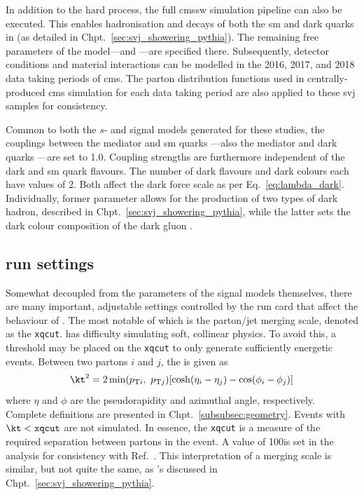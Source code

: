 In addition to the hard process, the full \acrshort{cmssw} simulation pipeline can also be executed. This enables hadronisation and decays of both the \acrshort{sm} and dark quarks in \PYTHIA (as detailed in Chpt.~\ref{sec:svj_showering_pythia}). The remaining free parameters of the model---\aDark and \rinv---are specified there. Subsequently, detector conditions and material interactions can be modelled in the 2016, 2017, and 2018 data taking periods of \acrshort{cms}. The parton distribution functions used in centrally-produced \acrshort{cms} simulation for each data taking period are also applied to these \gls{svj} samples for consistency.

Common to both the $s$- and \tchannel signal models generated for these studies, the couplings between the mediator and \acrshort{sm} quarks \gq---also the mediator and dark quarks \gqdark---are set to 1.0. Coupling strengths are furthermore independent of the dark and \acrshort{sm} quark flavours. The number of dark flavours and dark colours each have values of 2. Both affect the dark force scale as per Eq.~\ref{eq:lambda_dark}. Individually, former parameter allows for the production of two types of dark hadron, described in Chpt.~\ref{sec:svj_showering_pythia}, while the latter sets the dark colour composition of the dark gluon \Pgdark. 




\subsection{\texorpdfstring{\MADGRAPH}{MadGraph} run settings}
\label{subsec:svj_mg_run_settings}

Somewhat decoupled from the parameters of the signal models themselves, there are many important, adjustable settings controlled by the run card that affect the behaviour of \MADGRAPH. The most notable of which is the parton/\gls{jet} merging scale, denoted as the \texttt{xqcut}. \MADGRAPH has difficulty simulating soft, collinear physics. To avoid this, a threshold may be placed on the \texttt{xqcut} to only generate sufficiently energetic events. Between two partons $i$ and $j$, the \kt is given as
\begin{equation}
    \kt^2 = 2 \min(p_{\mathrm{T}i}, \ p_{\mathrm{T}j}) [\cosh(\eta_i - \eta_j) - \cos(\phi_i - \phi_j)]
    \label{eq:svj_mg_kt}
\end{equation}
where $\eta$ and $\phi$ are the pseudorapidity and azimuthal angle, respectively. Complete definitions are presented in Chpt.~\ref{subsubsec:geometry}. Events with $\kt < \texttt{xqcut}$ are not simulated. In essence, the \texttt{xqcut} is a measure of the required separation between partons in the event. A value of 100\GeV is set in the analysis for consistency with Ref.~. This interpretation of a merging scale is similar, but not quite the same, as \PYTHIA's discussed in Chpt.~\ref{sec:svj_showering_pythia}.

